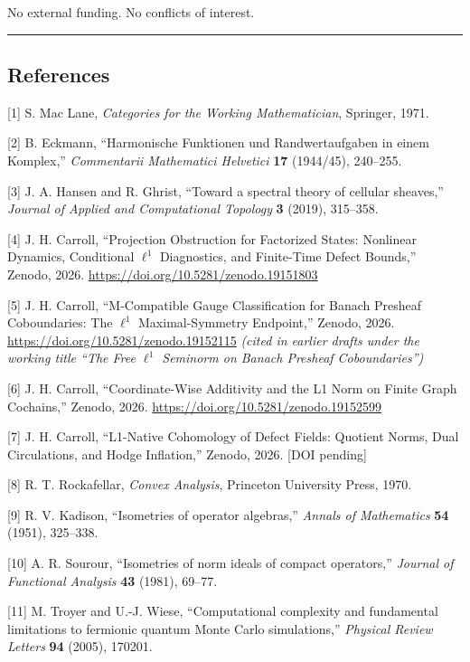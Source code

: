 \documentclass[
]{article}
\begin{document}
No external funding. No conflicts of interest.

\begin{center}\rule{0.5\linewidth}{0.5pt}\end{center}

\subsection{References}\label{references}

{[}1{]} S. Mac Lane, \emph{Categories for the Working Mathematician}, Springer, 1971.

{[}2{]} B. Eckmann, ``Harmonische Funktionen und Randwertaufgaben in einem Komplex,'' \emph{Commentarii Mathematici Helvetici} \textbf{17} (1944/45), 240--255.

{[}3{]} J. A. Hansen and R. Ghrist, ``Toward a spectral theory of cellular sheaves,'' \emph{Journal of Applied and Computational Topology} \textbf{3} (2019), 315--358.

{[}4{]} J. H. Carroll, ``Projection Obstruction for Factorized States: Nonlinear Dynamics, Conditional \(\ell^1\) Diagnostics, and Finite-Time Defect Bounds,'' Zenodo, 2026. \url{https://doi.org/10.5281/zenodo.19151803}

{[}5{]} J. H. Carroll, ``M-Compatible Gauge Classification for Banach Presheaf Coboundaries: The \(\ell^1\) Maximal-Symmetry Endpoint,'' Zenodo, 2026. \url{https://doi.org/10.5281/zenodo.19152115} \emph{(cited in earlier drafts under the working title ``The Free \(\ell^1\) Seminorm on Banach Presheaf Coboundaries'')}

{[}6{]} J. H. Carroll, ``Coordinate-Wise Additivity and the L1 Norm on Finite Graph Cochains,'' Zenodo, 2026. \url{https://doi.org/10.5281/zenodo.19152599}

{[}7{]} J. H. Carroll, ``L1-Native Cohomology of Defect Fields: Quotient Norms, Dual Circulations, and Hodge Inflation,'' Zenodo, 2026. {[}DOI pending{]}

{[}8{]} R. T. Rockafellar, \emph{Convex Analysis}, Princeton University Press, 1970.

{[}9{]} R. V. Kadison, ``Isometries of operator algebras,'' \emph{Annals of Mathematics} \textbf{54} (1951), 325--338.

{[}10{]} A. R. Sourour, ``Isometries of norm ideals of compact operators,'' \emph{Journal of Functional Analysis} \textbf{43} (1981), 69--77.

{[}11{]} M. Troyer and U.-J. Wiese, ``Computational complexity and fundamental limitations to fermionic quantum Monte Carlo simulations,'' \emph{Physical Review Letters} \textbf{94} (2005), 170201.
\end{document}
